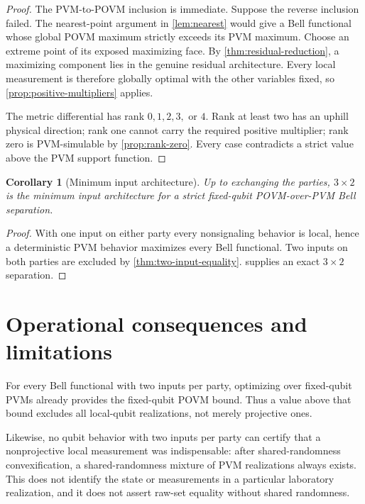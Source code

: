 \documentclass[11pt]{article}
\newtheorem{corollary}[theorem]{Corollary}
\theoremstyle{definition}
\begin{document}
\begin{proof}
The PVM-to-POVM inclusion is immediate. Suppose the reverse inclusion failed.
The nearest-point argument in \cref{lem:nearest} would give a Bell functional
whose global POVM maximum strictly exceeds its PVM maximum. Choose an extreme
point of its exposed maximizing face. By
\cref{thm:residual-reduction}, a maximizing component lies in the genuine
residual architecture. Every local measurement is therefore globally optimal
with the other variables fixed, so \cref{prop:positive-multipliers} applies.

The metric differential has rank \(0,1,2,3,\) or \(4\). Rank at least two has
an uphill physical direction; rank one cannot carry the required positive
multiplier; rank zero is PVM-simulable by \cref{prop:rank-zero}. Every case
contradicts a strict value above the PVM support function.
\end{proof}

\begin{corollary}[Minimum input architecture]
\label{cor:minimality}
Up to exchanging the parties, \(3\times2\) is the minimum input architecture
for a strict fixed-qubit POVM-over-PVM Bell separation.
\end{corollary}

\begin{proof}
With one input on either party every nonsignaling behavior is local, hence a
deterministic PVM behavior maximizes every Bell functional. Two inputs on both
parties are excluded by \cref{thm:two-input-equality}.
 supplies an exact \(3\times2\) separation.
\end{proof}

\section{Operational consequences and limitations}

For every Bell functional with two inputs per party, optimizing over
fixed-qubit PVMs already
provides the fixed-qubit POVM bound. Thus a value above that bound excludes
all local-qubit realizations, not merely projective ones.

Likewise, no qubit behavior with two inputs per party can certify that a
nonprojective local
measurement was indispensable: after shared-randomness convexification, a
shared-randomness mixture of PVM realizations always exists. This does not identify the state or
measurements in a particular laboratory realization, and it does not assert
raw-set equality without shared randomness.
\end{document}
